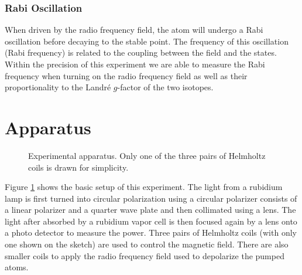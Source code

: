 \documentclass[aps,twocolumn,secnumarabic,balancelastpage,amsmath,amssymb,nofootinbib]{revtex4}
\begin{document}
\subsubsection{Rabi Oscillation}
When driven by the radio frequency field, the atom will undergo a Rabi oscillation before decaying to the stable point. The frequency of this oscillation (Rabi frequency) is related to the coupling between the field and the states. Within the precision of this experiment we are able to measure the Rabi frequency when turning on the radio frequency field as well as their proportionality to the Landr\'e $g$-factor of the two isotopes.

\section{Apparatus}
\begin{figure}
  \caption{Experimental apparatus. Only one of the three pairs of Helmholtz coils is drawn for simplicity.}
  \label{apparatus}
\end{figure}

Figure \ref{apparatus} shows the basic setup of this experiment. The light from a rubidium lamp is first turned into circular polarization using a circular polarizer consists of a linear polarizer and a quarter wave plate and then collimated using a lens. The light after absorbed by a rubidium vapor cell is then focused again by a lens onto a photo detector to measure the power. Three pairs of Helmholtz coils (with only one shown on the sketch) are used to control the magnetic field. There are also smaller coils to apply the radio frequency field used to depolarize the pumped atoms.
\end{document}
